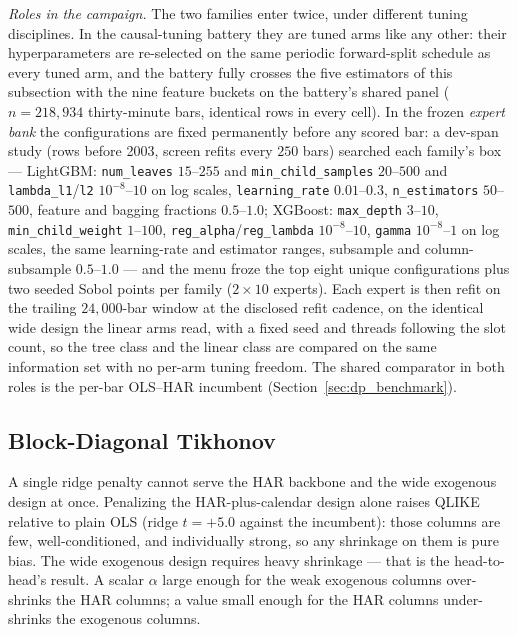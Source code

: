 \emph{Roles in the campaign.} The two families enter twice, under
different tuning disciplines. In the causal-tuning battery they are
tuned arms like any other: their hyperparameters are re-selected on the
same periodic forward-split schedule as every tuned arm, and the battery
fully crosses the five estimators of this subsection with the nine
feature buckets on the battery's shared panel ($n = 218{,}934$
thirty-minute bars, identical rows in every cell). In the frozen
\emph{expert bank} the configurations are fixed permanently before any
scored bar: a dev-span study (rows before 2003, screen refits every
$250$ bars) searched each family's box --- LightGBM:
\texttt{num\_leaves} $15$--$255$ and \texttt{min\_child\_samples}
$20$--$500$ and \texttt{lambda\_l1}/\texttt{l2} $10^{-8}$--$10$ on log
scales, \texttt{learning\_rate} $0.01$--$0.3$,
\texttt{n\_estimators} $50$--$500$, feature and bagging fractions
$0.5$--$1.0$; XGBoost: \texttt{max\_depth} $3$--$10$,
\texttt{min\_child\_weight} $1$--$100$,
\texttt{reg\_alpha}/\texttt{reg\_lambda} $10^{-8}$--$10$,
\texttt{gamma} $10^{-8}$--$1$ on log scales, the same learning-rate and
estimator ranges, subsample and column-subsample $0.5$--$1.0$ --- and
the menu froze the top eight unique configurations plus two seeded Sobol
points per family ($2 \times 10$ experts). Each expert is then refit on
the trailing $24{,}000$-bar window at the disclosed refit cadence, on
the identical wide design the linear arms read, with a fixed seed and
threads following the slot count, so the tree class and the linear
class are compared on the same information set with no per-arm tuning
freedom. The shared comparator in both roles is the per-bar OLS--HAR
incumbent (Section~\ref{sec:dp_benchmark}).

\subsection{Block-Diagonal Tikhonov}
\label{sec:block_tikhonov}
\label{sec:hierarchical_ridge}
\label{sec:dense_weak_twoblock}
\label{sec:three_block}

A single ridge penalty cannot serve the HAR backbone and the wide
exogenous design at once. Penalizing the HAR-plus-calendar design
alone raises QLIKE relative to plain OLS (ridge $t = +5.0$ against
the incumbent): those columns are few, well-conditioned, and
individually strong, so any shrinkage on them is pure bias. The wide
exogenous design requires heavy shrinkage --- that is the
head-to-head's result. A scalar $\alpha$ large enough for the weak
exogenous columns over-shrinks the HAR columns; a value small enough
for the HAR columns under-shrinks the exogenous columns.

